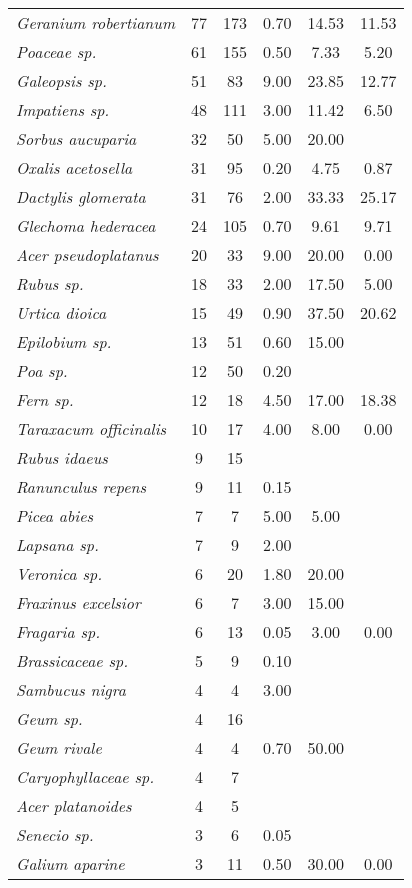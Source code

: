 \documentclass[a4paper]{article}
\begin{document}
\begin{longtable}[H]{@{} >{\itshape}lccccc @{}}
		 Geranium robertianum & 77 & 173 & 0.70 & 14.53 & 11.53 \\ 
		 Poaceae sp. & 61 & 155 & 0.50 & 7.33 & 5.20 \\ 
		 Galeopsis sp. & 51 & 83 & 9.00 & 23.85 & 12.77 \\ 
		 Impatiens sp. & 48 & 111 & 3.00 & 11.42 & 6.50 \\ 
		 Sorbus aucuparia & 32 & 50 & 5.00 & 20.00 &  \\ 
		 Oxalis acetosella & 31 & 95 & 0.20 & 4.75 & 0.87 \\ 
		 Dactylis glomerata & 31 & 76 & 2.00 & 33.33 & 25.17 \\ 
		 Glechoma hederacea & 24 & 105 & 0.70 & 9.61 & 9.71 \\ 
		 Acer pseudoplatanus & 20 & 33 & 9.00 & 20.00 & 0.00 \\ 
		 Rubus sp. & 18 & 33 & 2.00 & 17.50 & 5.00 \\ 
		 Urtica dioica & 15 & 49 & 0.90 & 37.50 & 20.62 \\ 
		 Epilobium sp. & 13 & 51 & 0.60 & 15.00 &  \\ 
		 Poa sp. & 12 & 50 & 0.20 &  &  \\ 
		 Fern sp. & 12 & 18 & 4.50 & 17.00 & 18.38 \\ 
		 Taraxacum officinalis & 10 & 17 & 4.00 & 8.00 & 0.00 \\ 
		 Rubus idaeus & 9 & 15 &  &  &  \\ 
		 Ranunculus repens & 9 & 11 & 0.15 &  &  \\ 
		 Picea abies & 7 & 7 & 5.00 & 5.00 &  \\ 
		 Lapsana sp. & 7 & 9 & 2.00 &  &  \\ 
		 Veronica sp. & 6 & 20 & 1.80 & 20.00 &  \\ 
		 Fraxinus excelsior & 6 & 7 & 3.00 & 15.00 &  \\ 
		 Fragaria sp. & 6 & 13 & 0.05 & 3.00 & 0.00 \\ 
		 Brassicaceae sp. & 5 & 9 & 0.10 &  &  \\ 
		 Sambucus nigra & 4 & 4 & 3.00 &  &  \\ 
		 Geum sp. & 4 & 16 &  &  &  \\ 
		 Geum rivale & 4 & 4 & 0.70 & 50.00 &  \\ 
		 Caryophyllaceae sp. & 4 & 7 &  &  &  \\ 
		 Acer platanoides & 4 & 5 &  &  &  \\ 
		 Senecio sp. & 3 & 6 & 0.05 &  &  \\ 
		 Galium aparine & 3 & 11 & 0.50 & 30.00 & 0.00 \\ 

\end{longtable}
\end{document}
